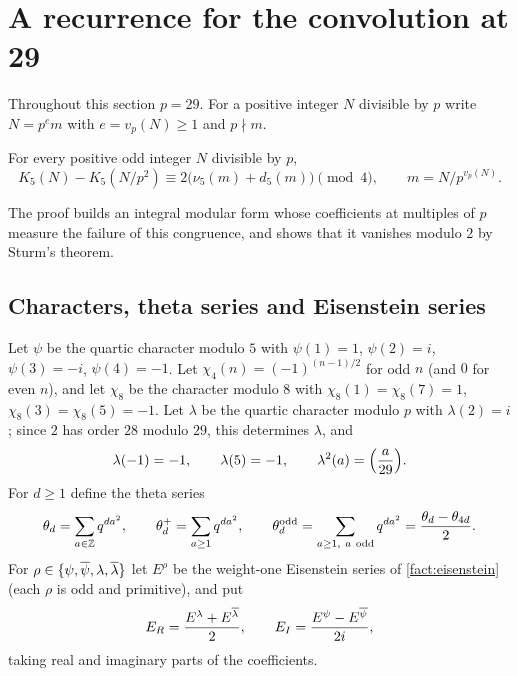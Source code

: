 \section{A recurrence for the convolution at 29}\label{sec:recurrence}

Throughout this section $p=29$. For a positive integer $N$ divisible by $p$ write
$N=p^em$ with $e=v_p(N)\ge1$ and $p\nmid m$.

\begin{theorem}\label{thm:K5-recurrence}
For every positive odd integer $N$ divisible by $p$,
\[
  K_5(N)-K_5(N/p^2)\equiv2\bigl(\nu_5(m)+d_5(m)\bigr)\pmod4,\qquad m=N/p^{v_p(N)} .
\]
\end{theorem}

The proof builds an integral modular form whose coefficients at multiples of $p$
measure the failure of this congruence, and shows that it vanishes modulo $2$ by
Sturm's theorem.

\subsection{Characters, theta series and Eisenstein series}
Let $\psi$ be the quartic character modulo $5$ with
$\psi(1)=1$, $\psi(2)=i$, $\psi(3)=-i$, $\psi(4)=-1$. Let $\chi_4(n)=(-1)^{(n-1)/2}$ for
odd $n$ (and $0$ for even $n$), and let $\chi_8$ be the character modulo $8$ with
$\chi_8(1)=\chi_8(7)=1$, $\chi_8(3)=\chi_8(5)=-1$. Let $\lambda$ be the quartic character
modulo $p$ with $\lambda(2)=i$; since $2$ has order $28$ modulo $29$, this determines
$\lambda$, and
\[
  \lambda(-1)=-1,\qquad \lambda(5)=-1,\qquad \lambda^2(a)=\Bigl(\frac{a}{29}\Bigr).
\]
For $d\ge1$ define the theta series
\[
  \theta_d=\sum_{a\in\Z}q^{da^2},\qquad
  \theta^+_d=\sum_{a\ge1}q^{da^2},\qquad
  \theta^{\mathrm{odd}}_d=\sum_{a\ge1,\ a\ \mathrm{odd}}q^{da^2}=\frac{\theta_d-\theta_{4d}}2 .
\]
For $\rho\in\{\psi,\overline\psi,\lambda,\overline\lambda\}$ let $E^\rho$ be the weight-one
Eisenstein series of \cref{fact:eisenstein} (each $\rho$ is odd and primitive), and put
\[
  E_R=\frac{E^\lambda+E^{\overline\lambda}}2,\qquad E_I=\frac{E^\psi-E^{\overline\psi}}{2i},
\]
taking real and imaginary parts of the coefficients.

